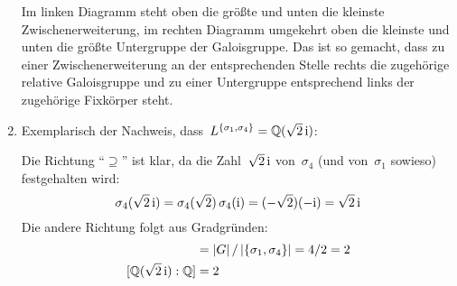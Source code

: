 \documentclass{../../algblatt}
\begin{document}
\begin{enumerate}
\begin{center}
\end{center}
Im linken Diagramm steht oben die größte und unten die kleinste
Zwischenerweiterung, im rechten Diagramm umgekehrt oben die kleinste und unten die
größte Un\-ter\-grup\-pe der Galoisgruppe. Das ist so gemacht, dass zu einer
Zwischenerweiterung an der entsprechenden Stelle rechts die zugehörige relative
Galoisgruppe und zu einer Untergruppe entsprechend links der zugehörige
Fixkörper steht.

\item Exemplarisch der Nachweis, dass~$L^{\{\sigma_1,\sigma_4\}} =
\mathbb{Q}(\sqrt{2}\,\mathrm{i})$:

Die Richtung "`$\supseteq$"' ist klar, da die Zahl~$\sqrt{2}\,\mathrm{i}$
von~$\sigma_4$ (und von~$\sigma_1$ sowieso) festgehalten wird:
\[ \sigma_4(\sqrt{2} \, \mathrm{i}) = \sigma_4(\sqrt{2}) \, \sigma_4(\mathrm{i}) = (-\sqrt{2}) (-\mathrm{i}) = \sqrt{2}\,\mathrm{i} \]
Die andere Richtung folgt aus Gradgründen:
\begin{align*}
  [L^{\{\sigma_1,\sigma_4\}} : \QQ] &= |G|\,/\,|\{\sigma_1,\sigma_4\}| = 4/2 = 2 \\
  [\QQ(\sqrt{2}\,\i):\QQ] &= 2
\end{align*}
\end{enumerate}
\end{document}
